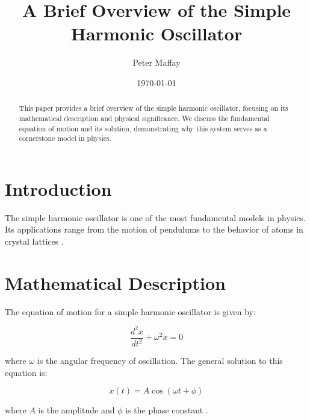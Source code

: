 \documentclass{article}  %
\title{A Brief Overview of the Simple Harmonic Oscillator}  %
\author{Peter Maffay}                                       %
\date{\today}                                               %
\begin{document}
\maketitle  %

\thispagestyle{fancy}  %

\begin{abstract}
This paper provides a brief overview of the simple harmonic oscillator,
focusing on its mathematical description and physical significance. We discuss
the fundamental equation of motion and its solution, demonstrating why this
system serves as a cornerstone model in physics.
\end{abstract}

\section{Introduction}
The simple harmonic oscillator is one of the most fundamental models in physics.
Its applications range from the motion of pendulums to the behavior of atoms
in crystal lattices \citep{feynman1963}.  %

\section{Mathematical Description}
The equation of motion for a simple harmonic oscillator is given by:

\begin{equation}
    \frac{d^2x}{dt^2} + \omega^2x = 0
\end{equation}

where $\omega$ is the angular frequency of oscillation. The general solution
to this equation is:

\begin{equation}
    x(t) = A\cos(\omega t + \phi)
\end{equation}

where $A$ is the amplitude and $\phi$ is the phase constant
\citep{goldstein2002}.  %
\end{document}
